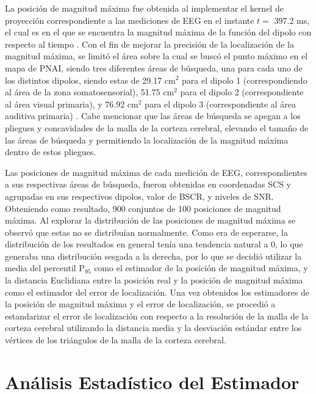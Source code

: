 La posición de magnitud máxima fue obtenida al implementar el kernel de proyección correspondiente a las mediciones de EEG en el instante $t=$ 397.2 ms, el cual es en el que se encuentra la magnitud máxima de la función del dipolo con respecto al tiempo .
Con el fin de mejorar la precisión de la localización de la magnitud máxima, se limitó el área sobre la cual se buscó el punto máximo en el mapa de PNAI, siendo tres diferentes áreas de búsqueda, una para cada uno de los distintos dipolos, siendo estas de 29.17 cm$^2$ para el dipolo 1 (correspondiendo al área de la zona somatosensorial), 51.75 cm$^2$ para el dipolo 2 (correspondiente al área visual primaria), y 76.92 cm$^2$ para el dipolo 3 (correspondiente al área auditiva primaria) .
Cabe mencionar que las áreas de búsqueda se apegan a los pliegues y concavidades de la malla de la corteza cerebral, elevando el tamaño de las áreas de búsqueda y permitiendo la localización de la magnitud máxima dentro de estos pliegues.

Las posiciones de magnitud máxima de cada medición de EEG, correspondientes a sus respectivas áreas de búsqueda, fueron obtenidas en coordenadas SCS y agrupadas en sus respectivos dipolos, valor de BSCR, y niveles de SNR.
Obteniendo como resultado, 900 conjuntos de 100 posiciones de magnitud máxima. 
Al explorar la distribución de las posiciones de magnitud máxima se observó que estas no se distribuían normalmente.
Como era de esperarse, la distribución de los resultados en general tenía una tendencia natural a 0, lo que generaba una distribución sesgada a la derecha, por lo que se decidió utilizar la media del percentil P$_{95}$ como el estimador de la posición de magnitud máxima, y la distancia Euclidiana entre la posición real y la posición de magnitud máxima como el estimador del error de localización.
Una vez obtenidos los estimadores de la posición de magnitud máxima y el error de localización, se procedió a estandarizar el error de localización con respecto a la resolución de la malla de la corteza cerebral utilizando la distancia media y la desviación estándar entre los vértices de los triángulos de la malla de la corteza cerebral. 

\section{Análisis Estadístico del Estimador}
\label{sec:methodology:cbr-analysis}

